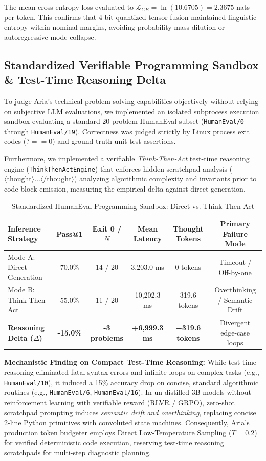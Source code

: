 \documentclass[10pt,a4paper]{article}
\begin{document}
The mean cross-entropy loss evaluated to $\mathcal{L}_{CE} = \ln(10.6705) = \mathbf{2.3675}$ nats per token. This confirms that 4-bit quantized tensor fusion maintained linguistic entropy within nominal margins, avoiding probability mass dilution or autoregressive mode collapse.

\subsection{Standardized Verifiable Programming Sandbox \& Test-Time Reasoning Delta}
To judge Aria's technical problem-solving capabilities objectively without relying on subjective LLM evaluations, we implemented an isolated subprocess execution sandbox evaluating a standard 20-problem HumanEval subset (\texttt{HumanEval/0} through \texttt{HumanEval/19}). Correctness was judged strictly by Linux process exit codes ($? == 0$) and ground-truth unit test assertions. 

Furthermore, we implemented a verifiable \textit{Think-Then-Act} test-time reasoning engine (\texttt{ThinkThenActEngine}) that enforces hidden scratchpad analysis ($\langle\text{thought}\rangle\dots\langle/\text{thought}\rangle$) analyzing algorithmic complexity and invariants prior to code block emission, measuring the empirical delta against direct generation.

\begin{table}[h!]
\centering
\caption{Standardized HumanEval Programming Sandbox: Direct vs. Think-Then-Act}
\label{tab:humaneval_benchmark}
\footnotesize
\setlength{\tabcolsep}{3.5pt}
\begin{tabular}{@{}lccccc@{}}
\toprule
\textbf{Inference Strategy} & \textbf{Pass@1} & \textbf{Exit 0 / $N$} & \textbf{Mean Latency} & \textbf{Thought Tokens} & \textbf{Primary Failure Mode} \\ \midrule
Mode A: Direct Generation & $\mathbf{70.0\%}$ & 14 / 20 & 3,203.0 ms & 0 tokens & Timeout / Off-by-one \\
Mode B: Think-Then-Act & $55.0\%$ & 11 / 20 & 10,202.3 ms & 319.6 tokens & Overthinking / Semantic Drift \\ \midrule
\textbf{Reasoning Delta ($\Delta$)} & \textbf{-15.0\%} & \textbf{-3 problems} & \textbf{+6,999.3 ms} & \textbf{+319.6 tokens} & Divergent edge-case loops \\ \bottomrule
\end{tabular}
\end{table}

\textbf{Mechanistic Finding on Compact Test-Time Reasoning:} While test-time reasoning eliminated fatal syntax errors and infinite loops on complex tasks (e.g., \texttt{HumanEval/10}), it induced a 15\% accuracy drop on concise, standard algorithmic routines (e.g., \texttt{HumanEval/6}, \texttt{HumanEval/16}). In un-distilled 3B models without reinforcement learning with verifiable reward (RLVR / GRPO), zero-shot scratchpad prompting induces \textit{semantic drift and overthinking}, replacing concise 2-line Python primitives with convoluted state machines. Consequently, Aria's production token budgeter employs Direct Low-Temperature Sampling ($T=0.2$) for verified deterministic code execution, reserving test-time reasoning scratchpads for multi-step diagnostic planning.
\end{document}

